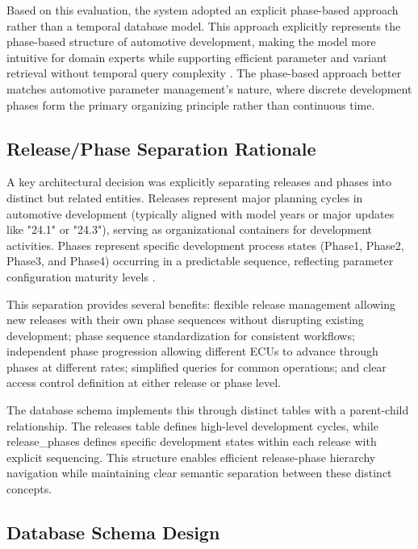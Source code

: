 Based on this evaluation, the system adopted an explicit phase-based approach rather than a temporal database model. This approach explicitly represents the phase-based structure of automotive development, making the model more intuitive for domain experts while supporting efficient parameter and variant retrieval without temporal query complexity \cite{bhattacherjee2015principles}. The phase-based approach better matches automotive parameter management's nature, where discrete development phases form the primary organizing principle rather than continuous time.

\subsection{Release/Phase Separation Rationale}
\label{subsec:release-phase-separation}

A key architectural decision was explicitly separating releases and phases into distinct but related entities. Releases represent major planning cycles in automotive development (typically aligned with model years or major updates like "24.1" or "24.3"), serving as organizational containers for development activities. Phases represent specific development process states (Phase1, Phase2, Phase3, and Phase4) occurring in a predictable sequence, reflecting parameter configuration maturity levels \cite{staron2021automotive}.

This separation provides several benefits: flexible release management allowing new releases with their own phase sequences without disrupting existing development; phase sequence standardization for consistent workflows; independent phase progression allowing different ECUs to advance through phases at different rates; simplified queries for common operations; and clear access control definition at either release or phase level.

The database schema implements this through distinct tables with a parent-child relationship. The releases table defines high-level development cycles, while release\_phases defines specific development states within each release with explicit sequencing. This structure enables efficient release-phase hierarchy navigation while maintaining clear semantic separation between these distinct concepts.

\subsection{Database Schema Design}
\label{subsec:database-schema-design}

